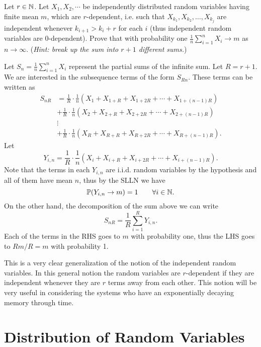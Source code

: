 \begin{problem}
	Let $ r\in \mathbb{N} $. Let $ X_1,X_2,\cdots $ be independently distributed random variables having finite mean $ m $, which are $ r\text{-dependent} $, i.e. such that $ X_{k_1},X_{k_2},\dots,X_{k_j} $ are independent whenever $ k_{i+1}>k_i + r $ for each $ i $ (thus independent random variables are 0-dependent). Prove that with probability one $ \frac{1}{n}\sum_{i=1}^{n}X_i \to m $ as $ n\to\infty $. (\emph{Hint: break up the sum into $ r+1 $ different sums.})
\end{problem}
\begin{solution}
	Let $ S_n = \frac{1}{n}\sum_{i=1}^{n}X_i $ represent the partial sums of the infinite sum. Let $ R = r+1 $. We are interested in the subsequence terms of the form $ S_{Rn} $. These terms can be written as
	\begin{align*}
		S_{nR} &= \frac{1}{R}\cdot\frac{1}{n}(X_1+X_{1+R}+X_{1+2R}+\cdots + X_{1+(n-1)R})\\
		&+ \frac{1}{R}\cdot\frac{1}{n}(X_2+X_{2+R}+X_{2+2R}+\cdots + X_{2+(n-1)R}) \\
		&\vdots \\
		&+ \frac{1}{R}\cdot\frac{1}{n}(X_R+X_{R+R}+X_{R+2R}+\cdots + X_{R+(n-1)R}).
	\end{align*}
	Let
	\[ Y_{i,n} = \frac{1}{R}\cdot\frac{1}{n}(X_i+X_{i+R}+X_{i+2R}+\cdots + X_{i+(n-1)R}). \]
	Note that the terms in each $ Y_{i,n} $ are i.i.d. random variables by the hypothesis and all of them have mean $ n $, thus by the SLLN we have
	\[ \mathbb{P}(Y_{i,n}\to m) = 1 \qquad \forall i\in \mathbb{N}. \]
	On the other hand, the decomposition of the sum above we can write
	\[ S_{nR} = \frac{1}{R}\sum_{i=1}^{R}Y_{{i,n}}. \]
	Each of the terms in the RHS goes to $ m $ with probability one, thus the LHS goes to $ Rm/R = m $ with probability 1.  
\end{solution}
\begin{remark}
	This is a very clear generalization of the notion of the independent random variables. In this general notion the random variables are $ r\text{-dependent} $ if they are independent whenever they are $ r $ terms away from each other. This notion will be very useful in considering the systems who have an exponentially decaying memory through time.
\end{remark}



\section{Distribution of Random Variables}

